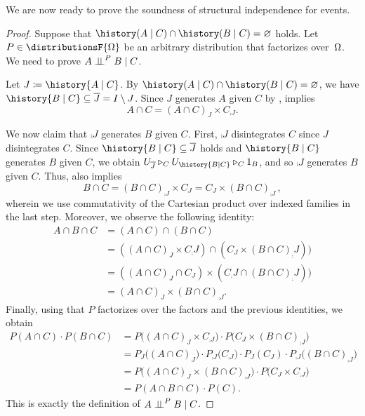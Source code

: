 \documentclass[USenglish,onecolumn]{article}
\begin{document}
We are now ready to prove the soundness of structural independence for events.
\soundevent*
\begin{proof}
Suppose that $\history(A\given C)\cap \history(B\given C)=\nothing$ holds.
Let $P \in \distributionsF{\factors}$ be an arbitrary distribution that factorizes over~$\Omega$. We need to prove $A\mathrel{\perp\!\!\!\perp}^PB\mid C$.

Let $J \coloneqq \history{A \given C}$.
By $\history(A\given C)\cap \history(B\given C)=\nothing$, we have $\history{B \given C} \subseteq \comp{J}=I\setminus J$.
%
Since $J$ generates $A$ given $C$ by ,  implies
  \begin{equation*}
    A \cap C = (A \cap C)_J \times C_{\comp{J}}.
  \end{equation*}

  We now claim that $\comp{J}$ generates $B$ given $C$.
  First, $\comp{J}$ disintegrates $C$ since $J$ disintegrates $C$.
  Since $\history{B \given C} \subseteq \comp{J}$ holds and $\history{B \given C}$ generates $B$ given $C$, we obtain
  \(
    U_{\comp{J}} \functionTo_C U_{\history{B \given C}} \functionTo_C 1_B
  \), and so $\comp{J}$ generates $B$ given $C$.
  Thus,  also implies
  \begin{equation*}
    B \cap C = (B \cap C)_{\comp{J}} \times C_{J} = C_J \times (B \cap C)_{\comp{J}}\,,
  \end{equation*}
  wherein we use commutativity of the Cartesian product over indexed families in the last step.
  Moreover, we observe the following identity:
  \begin{equation*}
  \begin{aligned}
    A \cap B \cap C &= (A \cap C) \cap (B \cap C)\\ &= ((A\cap C)_J\times C_\comp{J})\cap (C_J\times (B\cap C)_\comp{J}))\\
    &=((A\cap C)_J\cap C_J) \times (C_\comp{J}\cap(B\cap C)_\comp{J}))\\
    &= (A \cap C)_J \times (B \cap C)_{\comp{J}}.
  \end{aligned}
  \end{equation*}
  Finally, using that $P$ factorizes over the factors and the previous identities, we obtain
  \begin{align*}
    P(A \cap C) \cdot P(B \cap C) &= P\big( (A \cap C)_J \times C_{\comp{J}} \big) \cdot P \big( C_J \times (B \cap C)_{\comp{J}} \big) \\
    &= P_J\big( (A \cap C)_J \big) \cdot P_{\comp{J}}\big( C_{\comp{J}} \big) \cdot P_{J}(C_J) \cdot P_{\comp{J}}\big( (B \cap C)_{\comp{J}} \big) \\
    &= P\big( (A \cap C)_J \times (B \cap C)_{\comp{J}}\big) \cdot P\big( C_J \times C_{\comp{J}}  \big) \\
    &= P(A \cap B \cap C) \cdot P(C).
  \end{align*}
  This is exactly the definition of $A \mathrel{\perp\!\!\!\perp}^P B \mid C$.
%
\end{proof}
\end{document}
